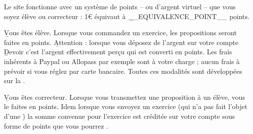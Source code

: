Le site \eDevoir fonctionne avec un système de points -- ou d'argent virtuel -- que vous soyez élève ou correcteur : 1€ équivaut à \b{__EQUIVALENCE_POINT__ points}.
\item \b{Vous êtes élève}. Lorsque vous commandez un exercice, les propositions seront faites en points. \b{Attention} : lorsque vous déposez de l'argent sur votre compte \b{Devoir} c'est l'argent effectivement perçu qui est converti en points. Les frais inhérents à Paypal ou Allopass par exemple sont à votre charge ; aucun frais à prévoir si vous réglez par carte bancaire. Toutes ces modalités sont développées sur la .
\item \b{Vous êtes correcteur}. Lorsque vous transmettez une proposition à un élève, vous le faites en points. Idem lorsque vous envoyez un exercice (qui n'a pas fait l'objet d'une ) la somme convenue pour l'exercice est créditée sur votre compte \eDevoir sous forme de points que vous pourrez .